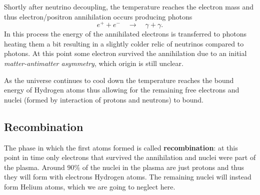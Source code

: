 Shortly after neutrino decoupling, the temperature reaches the electron mass and thus electron/positron annihilation occurs producing photons
$$e^++e^-\quad\longrightarrow\quad \gamma+\gamma.$$ In this process the energy of the annihilated electrons is transferred to photons heating them a bit resulting in a slightly colder relic of neutrinos compared to photons. At this point some electron survived the annihilation due to an initial \emph{matter-antimatter asymmetry}, which origin is still unclear.

As the universe continues to cool down the temperature reaches the bound energy of Hydrogen atoms thus allowing for the remaining free electrons and nuclei (formed by interaction of protons and neutrons) to bound. 
\subsection{Recombination}
The phase in which the first atoms formed is called \textbf{recombination}: at this point in time only electrons that survived the annihilation and nuclei were part of the plasma. Around $90\%$ of the nuclei in the plasma are just protons and thus they will form with electrons Hydrogen atoms. The remaining nuclei will instead form Helium atoms, which we are going to neglect here. 


